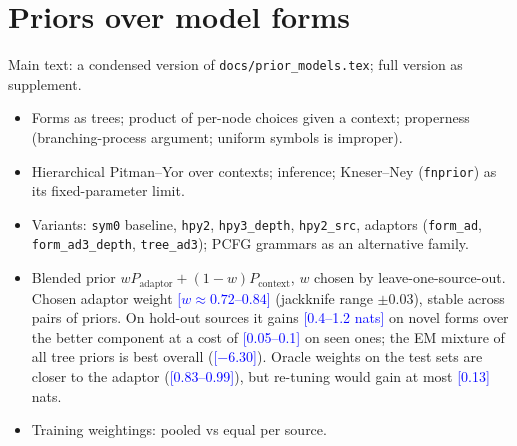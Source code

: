 \documentclass[11pt]{article}
\newcommand{\cur}[1]{\textcolor{blue}{[#1]}}
\begin{document}
\section{Priors over model forms}
Main text: a condensed version of \texttt{docs/prior\_models.tex}; full version as supplement.
\begin{itemize}
  \item Forms as trees; product of per-node choices given a context; properness (branching-process
  argument; uniform symbols is improper).
  \item Hierarchical Pitman--Yor over contexts; inference; Kneser--Ney (\texttt{fnprior}) as its
  fixed-parameter limit.
  \item Variants: \texttt{sym0} baseline, \texttt{hpy2}, \texttt{hpy3\_depth}, \texttt{hpy2\_src},
  adaptors (\texttt{form\_ad}, \texttt{form\_ad3\_depth}, \texttt{tree\_ad3}); PCFG grammars as an
  alternative family.
  \item Blended prior $w P_{\text{adaptor}} + (1-w) P_{\text{context}}$, $w$ chosen by leave-one-source-out.
  Chosen adaptor weight \cur{$w \approx 0.72$--$0.84$} (jackknife range $\pm 0.03$), stable across
  pairs of priors. On hold-out sources it gains \cur{0.4--1.2 nats} on novel forms over the better
  component at a cost of \cur{0.05--0.1} on seen ones; the EM mixture of all tree priors is best
  overall (\cur{$-6.30$}). Oracle weights on the test sets are closer to the adaptor
  (\cur{0.83--0.99}), but re-tuning would gain at most \cur{0.13} nats.
  \item Training weightings: pooled vs equal per source.
\end{itemize}

\end{document}
